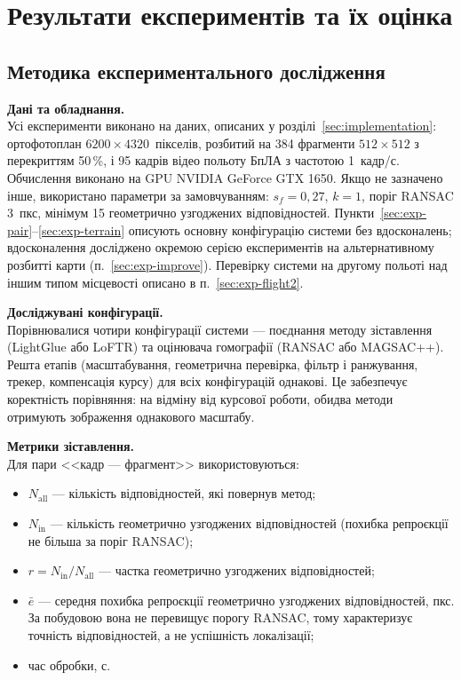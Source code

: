 \documentclass[a4paper, 12pt, titlepage]{article}
\begin{document}
\providecommand{\px}{пкс}
\providecommand{\code}[1]{\texttt{#1}}

\newpage
\section{Результати експериментів та їх оцінка}
\label{sec:experiments}

\subsection{Методика експериментального дослідження}

\textbf{Дані та обладнання.}\\
Усі експерименти виконано на даних, описаних у розділі~\ref{sec:implementation}: ортофотоплан $6200 \times 4320$~пікселів, розбитий на 384 фрагменти $512 \times 512$ з перекриттям 50\,\%, і 95 кадрів відео польоту БпЛА з частотою 1~кадр/с. Обчислення виконано на GPU NVIDIA GeForce GTX 1650. Якщо не зазначено інше, використано параметри за замовчуванням: $s_f = 0{,}27$, $k = 1$, поріг RANSAC 3~\px{}, мінімум 15 геометрично узгоджених відповідностей. Пункти~\ref{sec:exp-pair}--\ref{sec:exp-terrain} описують основну конфігурацію системи без вдосконалень; вдосконалення досліджено окремою серією експериментів на альтернативному розбитті карти (п.~\ref{sec:exp-improve}). Перевірку системи на другому польоті над іншим типом місцевості описано в п.~\ref{sec:exp-flight2}.

\textbf{Досліджувані конфігурації.}\\
Порівнювалися чотири конфігурації системи --- поєднання методу зіставлення (LightGlue або LoFTR) та оцінювача гомографії (RANSAC або MAGSAC++). Решта етапів (масштабування, геометрична перевірка, фільтр і ранжування, трекер, компенсація курсу) для всіх конфігурацій однакові. Це забезпечує коректність порівняння: на відміну від курсової роботи, обидва методи отримують зображення однакового масштабу.

\textbf{Метрики зіставлення.}\\
Для пари <<кадр --- фрагмент>> використовуються:
\begin{itemize}
    \item $N_{\text{all}}$ --- кількість відповідностей, які повернув метод;
    \item $N_{\text{in}}$ --- кількість геометрично узгоджених відповідностей (похибка репроєкції не більша за поріг RANSAC);
    \item $r = N_{\text{in}} / N_{\text{all}}$ --- частка геометрично узгоджених відповідностей;
    \item $\bar{e}$ --- середня похибка репроєкції геометрично узгоджених відповідностей, \px{}. За побудовою вона не перевищує порогу RANSAC, тому характеризує точність відповідностей, а не успішність локалізації;
    \item час обробки, с.
\end{itemize}
\end{document}
